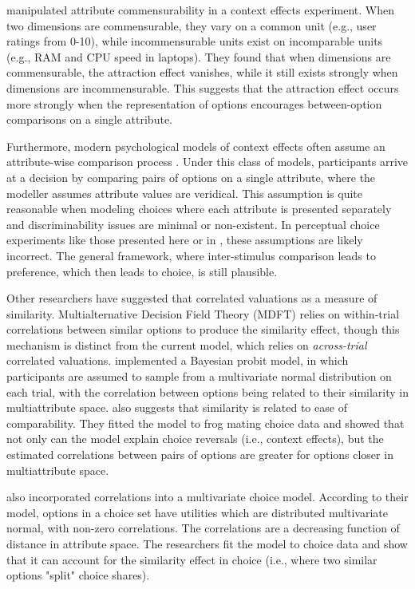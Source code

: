 \textcite{hayes2024attribute} manipulated attribute commensurability in a context effects experiment. When two dimensions are commensurable, they vary on a common unit (e.g., user ratings from 0-10), while incommensurable units exist on incomparable units (e.g., RAM and CPU speed in laptops). They found that when dimensions are commensurable, the attraction effect vanishes, while it still exists strongly when dimensions are incommensurable. This suggests that the attraction effect occurs more strongly when the representation of options encourages between-option comparisons on a single attribute.

Furthermore, modern psychological models of context effects often assume an attribute-wise comparison process \parencite{roeMultialternativeDecisionField2001a,trueblood2013not,usherLossAversionInhibition2004a,bhatiaAssociationsAccumulationPreference2013b}. Under this class of models, participants arrive at a decision by comparing pairs of options on a single attribute, where the modeller assumes attribute values are veridical. This assumption is quite reasonable when modeling choices where each attribute is presented separately and discriminability issues are minimal or non-existent. In perceptual choice experiments like those presented here or in \textcite{spektorWhenGoodLooks2018b,trueblood2013not}, these assumptions are likely incorrect. The general framework, where inter-stimulus comparison leads to preference, which then leads to choice, is still plausible.

Other researchers have suggested that correlated valuations as a measure of similarity. Multialternative Decision Field Theory (MDFT) \parencite{roeMultialternativeDecisionField2001a} relies on within-trial correlations between similar options to produce the similarity effect, though this mechanism is distinct from the current model, which relies on \textit{across-trial} correlated valuations. \textcite{natenzon2019random} implemented a Bayesian probit model, in which participants are assumed to sample from a multivariate normal distribution on each trial, with the correlation between options being related to their similarity in multiattribute space. \textcite{natenzon2019random} also suggests that similarity is related to ease of comparability. They fitted the model to frog mating choice data and showed that not only can the model explain choice reversals (i.e., context effects), but the estimated correlations between pairs of options are greater for options closer in multiattribute space. 

\textcite{kamakura1984predicting} also incorporated correlations into a multivariate choice model. According to their model, options in a choice set have utilities which are distributed multivariate normal, with non-zero correlations. The correlations are a decreasing function of distance in attribute space. The researchers fit the model to choice data and show that it can account for the similarity effect in choice (i.e., where two similar options "split" choice shares). 



